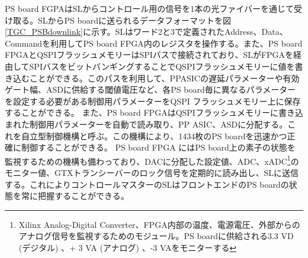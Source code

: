     PS board FGPAはSLからコントロール用の信号を1本の光ファイバーを通じて受け取る。SLからPS boardに送られるデータフォーマットを図\ref{TGC_PSBdownlink}に示す。SLはワード2と3で定義されたAddress、Data、Commandを利用してPS board FPGA内のレジスタを操作する。また、PS board FPGAとQSPIフラッシュメモリーはSPIバスで接続されており、SLがFPGAを経由してSPIバスをビットバンギングすることでQSPIフラッシュメモリーに値を書き込むことができる。このパスを利用して、PPASICの遅延パラメーターや有効ゲート幅、ASDに供給する閾値電圧など、各PS board毎に異なるパラメーターを設定する必要がある制御用パラメーターをQSPI フラッシュメモリー上に保存することができる。
    また、PS board FPGAはQSPIフラッシュメモリーに書き込まれた制御用パラメーターを自動で読み取り、PP ASIC、ASDに分配する。これを自立型制御機構と呼ぶ。この機構により、1434枚のPS boardを迅速かつ正確に制御することができる。
    PS board FPGA にはPS board上の素子の状態を監視するための機構も備わっており、DACに分配した設定値、ADC、xADC\footnote{Xilinx Analog-Digital Converter、FPGA内部の温度、電源電圧、外部からのアナログ信号を監視するためのモジュール。PS boardに供給される3.3 VD (デジタル) 、+ 3 VA (アナログ) 、-3 VAをモニターする}のモニター値、GTXトランシーバーのロック信号を定期的に読み出し、SLに送信する。これによりコントロールマスターのSLはフロントエンドのPS boardの状態を常に把握することができる。

